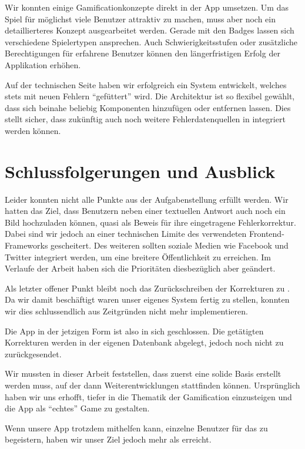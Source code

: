 Wir konnten einige Gamificationkonzepte direkt in der App umsetzen.
Um das Spiel für möglichst viele Benutzer attraktiv zu machen, muss aber noch ein detaillierteres Konzept ausgearbeitet werden.
Gerade mit den Badges lassen sich verschiedene Spielertypen ansprechen.
Auch Schwierigkeitsstufen oder zusätzliche Berechtigungen für erfahrene Benutzer können den längerfristigen Erfolg der Applikation erhöhen.

Auf der technischen Seite haben wir erfolgreich ein System entwickelt, welches stets mit neuen Fehlern "`gefüttert"' wird.
Die Architektur ist so flexibel gewählt, dass sich beinahe beliebig Komponenten hinzufügen oder entfernen lassen.
Dies stellt sicher, dass zukünftig auch noch weitere Fehlerdatenquellen in \kort{} integriert werden können.

\section{Schlussfolgerungen und Ausblick}
Leider konnten nicht alle Punkte aus der Aufgabenstellung erfüllt werden.
Wir hatten das Ziel, dass Benutzern neben einer textuellen Antwort auch noch ein Bild hochzuladen können, quasi als Beweis für ihre eingetragene Fehlerkorrektur.
Dabei sind wir jedoch an einer technischen Limite des verwendeten Frontend-Frameworks  gescheitert.
Des weiteren sollten soziale Medien wie Facebook und Twitter integriert werden, um eine breitere Öffentlichkeit zu erreichen.
Im Verlaufe der Arbeit haben sich die Prioritäten diesbezüglich aber geändert.

Als letzter offener Punkt bleibt noch das Zurückschreiben der Korrekturen zu .
Da wir damit beschäftigt waren unser eigenes System fertig zu stellen, konnten wir dies schlussendlich aus Zeitgründen nicht mehr implementieren.

Die App in der jetzigen Form ist also in sich geschlossen. Die getätigten Korrekturen werden in der eigenen Datenbank abgelegt, jedoch noch nicht zu  zurückgesendet.

Wir mussten in dieser Arbeit feststellen, dass zuerst eine solide Basis erstellt werden muss, auf der dann Weiterentwicklungen stattfinden können.
Ursprünglich haben wir uns erhofft, tiefer in die Thematik der \gls{Gamification} einzusteigen und die App als "`echtes"' Game zu gestalten.

Wenn unsere App trotzdem mithelfen kann, einzelne Benutzer für das  zu begeistern, haben wir unser Ziel jedoch mehr als erreicht.